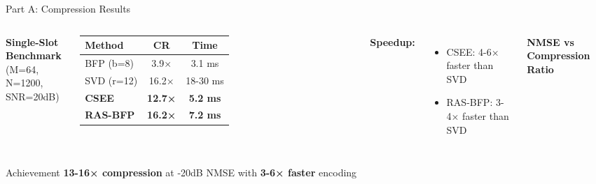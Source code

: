 \documentclass[aspectratio=169]{beamer}
\begin{document}
\begin{frame}{Part A: Compression Results}
\begin{columns}
\textbf{Single-Slot Benchmark}\\
(M=64, N=1200, SNR=20dB)

\begin{table}
\tiny
\begin{tabular}{lcc}
\toprule
\textbf{Method} & \textbf{CR} & \textbf{Time} \\
\midrule
BFP (b=8) & 3.9× & 3.1 ms \\
SVD (r=12) & 16.2× & 18-30 ms \\
\textbf{CSEE} & \textbf{12.7×} & \textbf{5.2 ms} \\
\textbf{RAS-BFP} & \textbf{16.2×} & \textbf{7.2 ms} \\
\bottomrule
\end{tabular}
\end{table}

\textbf{Speedup:}
\begin{itemize}
    \item CSEE: 4-6× faster than SVD
    \item RAS-BFP: 3-4× faster than SVD
\end{itemize}

\textbf{NMSE vs Compression Ratio}
\begin{center}
\end{center}
\end{columns}

\begin{alertblock}{Achievement}
\textbf{13-16× compression} at -20dB NMSE with \textbf{3-6× faster} encoding
\end{alertblock}
\end{frame}
\end{document}
